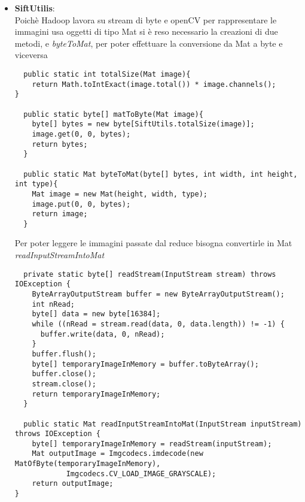 \begin{itemize}
\item  \textbf{SiftUtilis}: \\
Poichè Hadoop lavora su stream di byte e openCV per rappresentare le immagini usa oggetti di tipo Mat si è reso necessario la creazioni di due metodi,  e \emph{\textit{byteToMat}}, per poter effettuare la conversione da Mat a byte e viceversa
\begin{lstlisting}
  public static int totalSize(Mat image){
    return Math.toIntExact(image.total()) * image.channels();
}

  public static byte[] matToByte(Mat image){
    byte[] bytes = new byte[SiftUtils.totalSize(image)];
    image.get(0, 0, bytes);
    return bytes;
  }
  
  public static Mat byteToMat(byte[] bytes, int width, int height, int type){
    Mat image = new Mat(height, width, type);
    image.put(0, 0, bytes);
    return image;
  }
\end{lstlisting}
Per poter leggere le immagini passate dal reduce bisogna convertirle in Mat \emph{\textit{readInputStreamIntoMat}}
\begin{lstlisting}
  private static byte[] readStream(InputStream stream) throws IOException {
    ByteArrayOutputStream buffer = new ByteArrayOutputStream();
    int nRead;
    byte[] data = new byte[16384];
    while ((nRead = stream.read(data, 0, data.length)) != -1) {
      buffer.write(data, 0, nRead);
    }
    buffer.flush();
    byte[] temporaryImageInMemory = buffer.toByteArray();
    buffer.close();
    stream.close();
    return temporaryImageInMemory;
  }

  public static Mat readInputStreamIntoMat(InputStream inputStream) throws IOException {
    byte[] temporaryImageInMemory = readStream(inputStream);
    Mat outputImage = Imgcodecs.imdecode(new MatOfByte(temporaryImageInMemory),
            Imgcodecs.CV_LOAD_IMAGE_GRAYSCALE);
    return outputImage;
}
\end{lstlisting}
\end{itemize}
